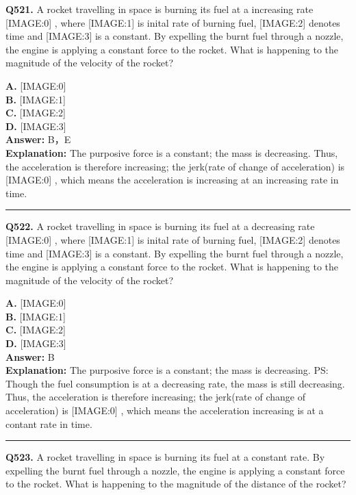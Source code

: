 \documentclass[12pt]{article}
\begin{document}
\noindent
\textbf{Q521.} A rocket travelling in space is burning its fuel at a increasing rate
[IMAGE:0]
, where
[IMAGE:1]
is inital rate of burning fuel,
[IMAGE:2]
denotes time and
[IMAGE:3]
is a constant. By expelling the burnt fuel through a nozzle, the engine is applying a constant force to the rocket.
What is happening to the magnitude of the velocity of the rocket?



\textbf{A.} [IMAGE:0] \\
\textbf{B.} [IMAGE:1] \\
\textbf{C.} [IMAGE:2] \\
\textbf{D.} [IMAGE:3] \\

\textbf{Answer:} B，E \\
\textbf{Explanation:} The purposive force is a constant; the mass is decreasing.
Thus, the acceleration is therefore increasing;
the jerk(rate of change of acceleration) is
[IMAGE:0]
, which means the acceleration is increasing at an increasing rate in time.

\hrule
\vspace{1em}


\noindent
\textbf{Q522.} A rocket travelling in space is burning its fuel at a decreasing rate
[IMAGE:0]
, where
[IMAGE:1]
is inital rate of burning fuel,
[IMAGE:2]
denotes time and
[IMAGE:3]
is a constant. By expelling the burnt fuel through a nozzle, the engine is applying a constant force to the rocket.
What is happening to the magnitude of the velocity of the rocket?



\textbf{A.} [IMAGE:0] \\
\textbf{B.} [IMAGE:1] \\
\textbf{C.} [IMAGE:2] \\
\textbf{D.} [IMAGE:3] \\

\textbf{Answer:} B \\
\textbf{Explanation:} The purposive force is a constant; the mass is decreasing.
PS: Though the fuel consumption is at a decreasing rate, the mass is still decreasing.
Thus, the acceleration is therefore increasing;
the jerk(rate of change of acceleration) is
[IMAGE:0]
, which means the acceleration increasing is at a contant rate in time.

\hrule
\vspace{1em}


\noindent
\textbf{Q523.} A rocket travelling in space is burning its fuel at a constant rate. By expelling the burnt fuel through a nozzle, the engine is applying a constant force to the rocket.
What is happening to the magnitude of the distance of the rocket?
\end{document}

